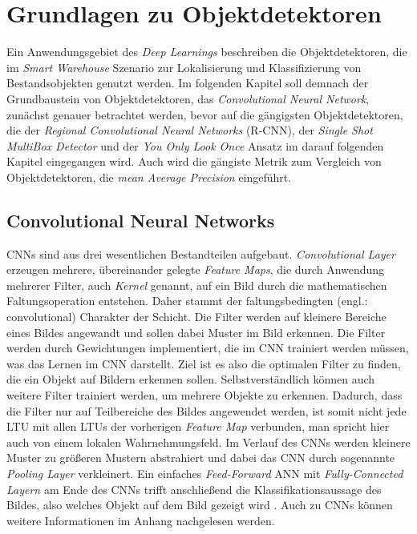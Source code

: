 \section{Grundlagen zu Objektdetektoren} \label{basics}

Ein Anwendungsgebiet des \textit{Deep Learnings} beschreiben die Objektdetektoren, die im \textit{Smart Warehouse} Szenario zur Lokalisierung und Klassifizierung von Bestandsobjekten genutzt werden. Im folgenden Kapitel soll demnach der Grundbaustein von Objektdetektoren, das \textit{Convolutional Neural Network}, zunächst genauer betrachtet werden, bevor auf die gängigsten Objektdetektoren, die der \textit{Regional Convolutional Neural Networks} (R-CNN), der \textit{Single Shot MultiBox Detector} und der \textit{You Only Look Once} Ansatz im darauf folgenden Kapitel eingegangen wird. Auch wird die gängiste Metrik zum Vergleich von Objektdetektoren, die \textit{mean Average Precision} eingeführt.

\subsection*{Convolutional Neural Networks}

CNNs sind aus drei wesentlichen Bestandteilen aufgebaut. \textit{Convolutional Layer} erzeugen mehrere, übereinander gelegte \textit{Feature Maps}, die durch Anwendung mehrerer Filter, auch \textit{Kernel} genannt, auf ein Bild durch die mathematischen Faltungsoperation entstehen. Daher stammt der \glqq faltungsbedingten\grqq{} (engl.: convolutional) Charakter der Schicht. Die Filter werden auf kleinere Bereiche eines Bildes angewandt und sollen dabei Muster im Bild erkennen. Die Filter werden durch Gewichtungen implementiert, die im CNN trainiert werden müssen, was das \glqq Lernen\grqq{} im CNN darstellt. Ziel ist es also die optimalen Filter zu finden, die ein Objekt auf Bildern erkennen sollen. Selbstverständlich können auch weitere Filter trainiert werden, um mehrere Objekte zu erkennen. Dadurch, dass die Filter nur auf Teilbereiche des Bildes angewendet werden, ist somit nicht jede LTU mit allen LTUs der vorherigen \textit{Feature Map} verbunden, man spricht hier auch von einem \glqq lokalen Wahrnehmungsfeld\grqq{}. Im Verlauf des CNNs werden kleinere Muster zu größeren Mustern abstrahiert und dabei das CNN durch sogenannte \textit{Pooling Layer} verkleinert. Ein einfaches \textit{Feed-Forward} ANN mit \textit{Fully-Connected Layern} am Ende des CNNs trifft anschließend die Klassifikationsaussage des Bildes, also welches Objekt auf dem Bild gezeigt wird \cite{AurelienGeron.2018}. Auch zu CNNs können weitere Informationen im Anhang nachgelesen werden.